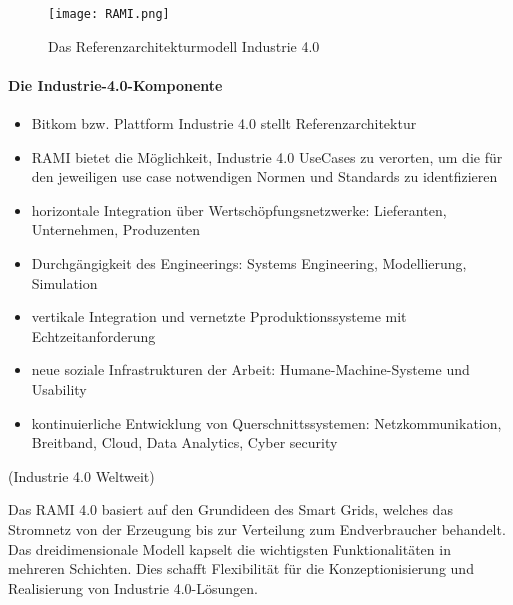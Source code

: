\begin{figure}[h]
  \texttt{[image: RAMI.png]}
  \caption[Das Referenzarchitekturmodell Industrie 4.0]{Das Referenzarchitekturmodell Industrie 4.0 \citep{BITKOM2015}}
  \label{fig:rami}
\end{figure}

\paragraph{Die Industrie-4.0-Komponente}


\begin{itemize}
  \item Bitkom bzw. Plattform Industrie 4.0 stellt Referenzarchitektur
  \item RAMI bietet die Möglichkeit, Industrie 4.0 UseCases zu verorten, um die für den jeweiligen use case notwendigen Normen und Standards zu identfizieren
  \item horizontale Integration über Wertschöpfungsnetzwerke: Lieferanten, Unternehmen, Produzenten
  \item Durchgängigkeit des Engineerings: Systems Engineering, Modellierung, Simulation
  \item vertikale Integration und vernetzte Pproduktionssysteme mit Echtzeitanforderung
  \item neue soziale Infrastrukturen der Arbeit: Humane-Machine-Systeme und Usability
  \item kontinuierliche Entwicklung von Querschnittssystemen: Netzkommunikation, Breitband, Cloud, Data Analytics, Cyber security
\end{itemize}

(Industrie 4.0 Weltweit)

Das RAMI 4.0 basiert auf den Grundideen des Smart Grids, welches das Stromnetz von der Erzeugung bis zur Verteilung zum Endverbraucher behandelt. Das dreidimensionale Modell kapselt die wichtigsten Funktionalitäten in mehreren Schichten. Dies schafft Flexibilität für die Konzeptionisierung und Realisierung von Industrie 4.0-Lösungen.

